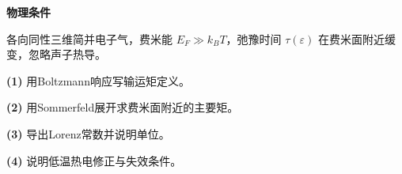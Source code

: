 \textbf{物理条件}\par 各向同性三维简并电子气，费米能 \(E_F\gg k_BT\)，弛豫时间 \(\tau(\varepsilon)\) 在费米面附近缓变，忽略声子热导。
\par\noindent\textbf{(1)} 用Boltzmann响应写输运矩定义。
\par\noindent\textbf{(2)} 用Sommerfeld展开求费米面附近的主要矩。
\par\noindent\textbf{(3)} 导出Lorenz常数并说明单位。
\par\noindent\textbf{(4)} 说明低温热电修正与失效条件。
